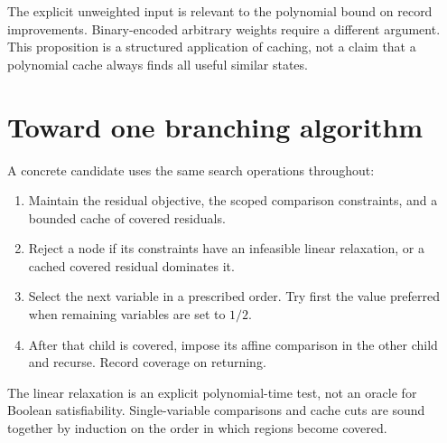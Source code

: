 \documentclass[11pt,a4paper]{article}
\theoremstyle{definition}
\theoremstyle{remark}
\begin{document}
The explicit unweighted input is relevant to the polynomial bound on record
improvements. Binary-encoded arbitrary weights require a different argument.
This proposition is a structured application of caching, not a claim that
a polynomial cache always finds all useful similar states.

\section{Toward one branching algorithm}\label{sec:unified}

A concrete candidate uses the same search operations throughout:
\begin{enumerate}
\item Maintain the residual objective, the scoped comparison constraints,
and a bounded cache of covered residuals.
\item Reject a node if its constraints have an infeasible linear relaxation,
or a cached covered residual dominates it.
\item Select the next variable in a prescribed order. Try first the value
preferred when remaining variables are set to $1/2$.
\item After that child is covered, impose its affine comparison in the other
child and recurse. Record coverage on returning.
\end{enumerate}
The linear relaxation is an explicit polynomial-time test, not an oracle
for Boolean satisfiability. Single-variable comparisons and cache cuts are
sound together by induction on the order in which regions become covered.
\end{document}
